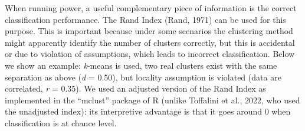 \documentclass[
  man,floatsintext]{apa6}
\begin{document}
When running power, a useful complementary piece of information is the correct classification performance. The Rand Index (Rand, 1971) can be used for this purpose. This is important because under some scenarios the clustering method might apparently identify the number of clusters correctly, but this is accidental or due to violation of assumptions, which leads to incorrect classification. Below we show an example: \emph{k}-means is used, two real clusters exist with the same separation as above (\emph{d} = 0.50), but locality assumption is violated (data are correlated, \emph{r} = 0.35). We used an adjusted version of the Rand Index as implemented in the ``mclust'' package of R (unlike Toffalini et al., 2022, who used the unadjusted index): its interpretive advantage is that it goes around 0 when classification is at chance level.
\end{document}
